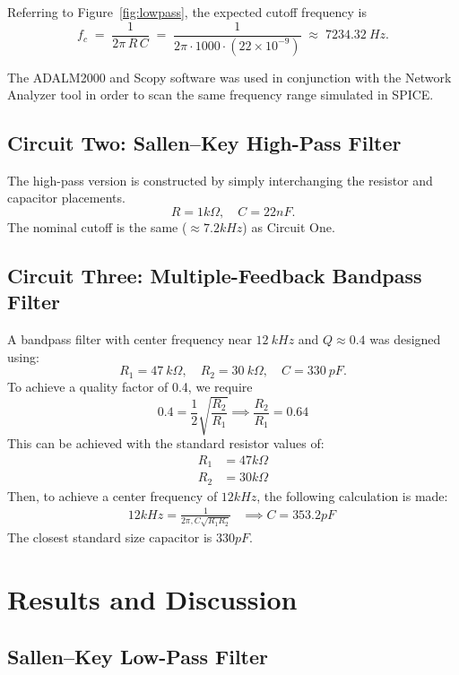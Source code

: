\documentclass[12pt]{article}
\begin{document}
Referring to Figure~\ref{fig:lowpass}, the expected cutoff frequency is
\begin{equation*}
	f_c \;=\;
	\frac{1}{2\pi\,R\,C}
	\;=\;
	\frac{1}{2\pi \cdot 1000 \cdot (22\times10^{-9})}
	\;\approx\;
	\SI{7234.32}{Hz}.
\end{equation*}

The ADALM2000 and Scopy software was used in conjunction with the Network
Analyzer tool in order to scan the same frequency range simulated in SPICE.
\subsection{Circuit Two: Sallen--Key High-Pass Filter}
The high-pass version is constructed by simply interchanging the resistor and
capacitor placements.
\[
	R = 1k\Omega, \quad C = 22nF.
\]
The nominal cutoff is the same ($\approx7.2kHz$) as Circuit One.

\subsection{Circuit Three: Multiple-Feedback Bandpass Filter}
A bandpass filter with center frequency near $\SI{12}{kHz}$ and $Q\approx 0.4$
was designed using:
\begin{equation*}
	R_1 = \SI{47}{k\Omega},
	\quad
	R_2 = \SI{30}{k\Omega},
	\quad
	C   = \SI{330}{pF}.
\end{equation*}
To achieve a quality factor of 0.4, we require
\[
	0.4 = \frac{1}{2}\sqrt{\frac{R_2}{R_1}} \implies \frac{R_2}{R_1} = 0.64
\]
This can be achieved with the standard resistor values of:
\begin{align*}
	R_1 & = 47k\Omega \\
	R_2 & = 30k\Omega
\end{align*}
Then, to achieve a center frequency of $12kHz$, the following calculation is made:
\begin{align*}
	12kHz = \frac{1}{2\pi,C\sqrt{R_1R_2}} & \implies C = 353.2pF\
\end{align*}
The closest standard size capacitor is $330pF$.

\section{Results and Discussion}

\subsection{Sallen--Key Low-Pass Filter}
\end{document}

